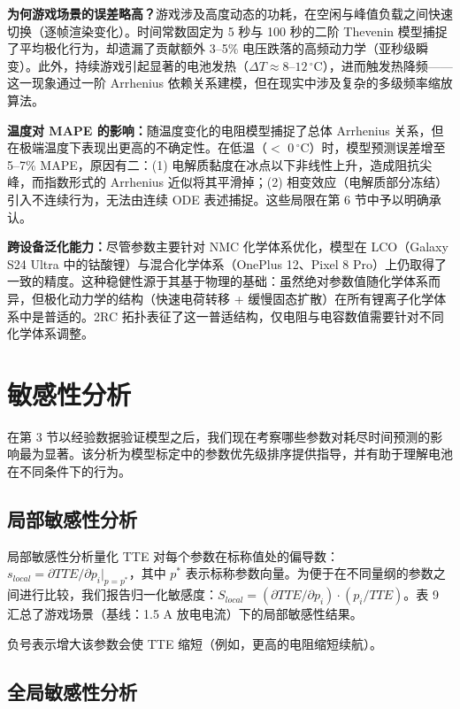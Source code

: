 \documentclass[11pt,a4paper]{ctexart}
\begin{document}
\textbf{为何游戏场景的误差略高？}游戏涉及高度动态的功耗，在空闲与峰值负载之间快速切换（逐帧渲染变化）。时间常数固定为 5 秒与 100 秒的二阶 Thevenin 模型捕捉了平均极化行为，却遗漏了贡献额外 3--5\% 电压跌落的高频动力学（亚秒级瞬变）。此外，持续游戏引起显著的电池发热（$\Delta T \approx 8$--$12\,^{\circ}$C），进而触发热降频——这一现象通过一阶 Arrhenius 依赖关系建模，但在现实中涉及复杂的多级频率缩放算法。

\textbf{温度对 MAPE 的影响：}随温度变化的电阻模型捕捉了总体 Arrhenius 关系，但在极端温度下表现出更高的不确定性。在低温（$<$ 0\,$^{\circ}$C）时，模型预测误差增至 5--7\% MAPE，原因有二：(1) 电解质黏度在冰点以下非线性上升，造成阻抗尖峰，而指数形式的 Arrhenius 近似将其平滑掉；(2) 相变效应（电解质部分冻结）引入不连续行为，无法由连续 ODE 表述捕捉。这些局限在第 6 节中予以明确承认。

\textbf{跨设备泛化能力：}尽管参数主要针对 NMC 化学体系优化，模型在 LCO（Galaxy S24 Ultra 中的钴酸锂）与混合化学体系（OnePlus 12、Pixel 8 Pro）上仍取得了一致的精度。这种稳健性源于其基于物理的基础：虽然绝对参数值随化学体系而异，但极化动力学的结构（快速电荷转移 + 缓慢固态扩散）在所有锂离子化学体系中是普适的。2RC 拓扑表征了这一普适结构，仅电阻与电容数值需要针对不同化学体系调整。

\section{敏感性分析}

在第 3 节以经验数据验证模型之后，我们现在考察哪些参数对耗尽时间预测的影响最为显著。该分析为模型标定中的参数优先级排序提供指导，并有助于理解电池在不同条件下的行为。

\subsection{局部敏感性分析}

局部敏感性分析量化 TTE 对每个参数在标称值处的偏导数：$s_{local} = \partial TTE/\partial p_i\big|_{p=p^*}$，其中 $p^*$ 表示标称参数向量。为便于在不同量纲的参数之间进行比较，我们报告归一化敏感度：$S_{local} = (\partial TTE/\partial p_i)\cdot(p_i/TTE)$。表 9 汇总了游戏场景（基线：1.5 A 放电电流）下的局部敏感性结果。

负号表示增大该参数会使 TTE 缩短（例如，更高的电阻缩短续航）。

\subsection{全局敏感性分析}
\end{document}
